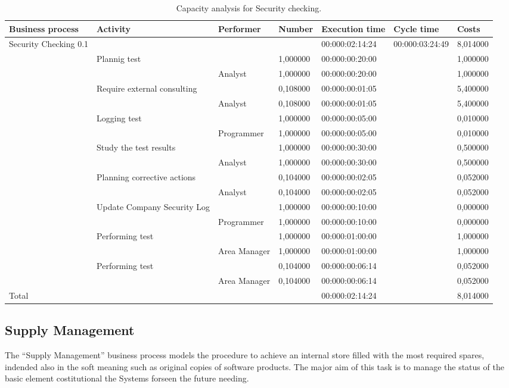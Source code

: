 \begin{landscape}
\begin{table}
\centering
{\tiny
\begin{tabular}{|l|l|l|l|l|l|l|}
Business process&Activity&Performer&Number&Execution time&Cycle time&Costs\\
\hline
Security Checking 0.1&&&&00:000:02:14:24&00:000:03:24:49&8,014000\\
\hline
&Plannig test &&1,000000&00:000:00:20:00&&1,000000\\
\hline
&&Analyst &1,000000&00:000:00:20:00&&1,000000\\
\hline
&Require external consulting &&0,108000&00:000:00:01:05&&5,400000\\
\hline
&&Analyst &0,108000&00:000:00:01:05&&5,400000\\
\hline
&Logging test &&1,000000&00:000:00:05:00&&0,010000\\
\hline
&&Programmer &1,000000&00:000:00:05:00&&0,010000\\
\hline
&Study the test results &&1,000000&00:000:00:30:00&&0,500000\\
\hline
&&Analyst &1,000000&00:000:00:30:00&&0,500000\\
\hline
&Planning corrective actions &&0,104000&00:000:00:02:05&&0,052000\\
\hline
&&Analyst &0,104000&00:000:00:02:05&&0,052000\\
\hline
&Update Company Security Log &&1,000000&00:000:00:10:00&&0,000000\\
\hline
&&Programmer &1,000000&00:000:00:10:00&&0,000000\\
\hline
&Performing test &&1,000000&00:000:01:00:00&&1,000000\\
\hline
&&Area Manager &1,000000&00:000:01:00:00&&1,000000\\
\hline
&Performing test &&0,104000&00:000:00:06:14&&0,052000\\
\hline
&&Area Manager &0,104000&00:000:00:06:14&&0,052000\\
\hline
Total&&&&00:000:02:14:24&&8,014000
\end{tabular}
}
\caption{Capacity analysis for Security checking.}
\end{table}
\end{landscape}


\subsection{Supply Management}
The ``Supply Management'' business process models the procedure to achieve an internal store filled with the most required spares, indended also in the soft meaning such as original copies of software products. The major aim of this task is to manage the status of the basic element costitutional the Systems forseen the future needing.

